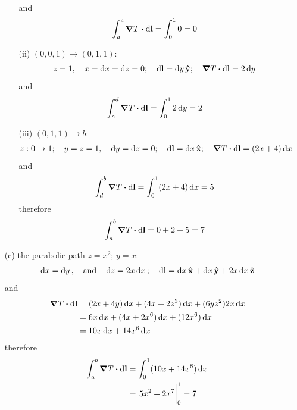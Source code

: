 \documentclass[../main.tex]{subfiles}
\begin{document}
\begin{itemize}
\begin{enumerate}
\begin{align*}
        \end{align*}
        and
        \begin{align*}
            \int_a^c \grad{T} \vdot \dd{\vb{l}} = \int_0^1 0 = 0
        \end{align*}
        \item [(ii)] $(0,0,1) \to (0,1,1)$:
        \begin{align*}
            z = 1, \quad x = \dd{x} = \dd{z} = 0; \quad \dd{\vb{l}} = \dd{y} \vu{y};
                \quad \grad{T} \vdot \dd{\vb{l}} = 2 \dd{y}
        \end{align*}
        and
        \begin{align*}
            \int_c^d \grad{T} \vdot \dd{\vb{l}} = \int_0^1 2 \dd{y} = 2
        \end{align*}
        \item [(iii)] $(0,1,1) \to b$:
        \begin{align*}
            z: 0 \to 1 ;\quad y = z = 1, \quad \dd{y} = \dd{z} = 0; \quad \dd{\vb{l}} = \dd{x} \vu{x};
                \quad \grad{T} \vdot \dd{\vb{l}} = (2x+4) \dd{x}
        \end{align*}
        and
        \begin{align*}
            \int_d^b \grad{T} \vdot \dd{\vb{l}} = \int_0^1 (2x+4) \dd{x} = 5
        \end{align*}
        therefore
        \begin{align*}
            \int_a^b \grad{T} \vdot \dd{\vb{l}} = 0 + 2 + 5 = 7
        \end{align*}
    \end{enumerate}
    \item[(c)] the parabolic path $z = x^2$; $y = x$:
    \begin{align*}
        \dd{x} = \dd{y}, \qand \dd{z} = 2x \dd{x}; \quad
        \dd{\vb{l}} = \dd{x} \vu{x} + \dd{x} \vu{y} + 2x\dd{x} \vu{z}
    \end{align*}
    and
    \begin{align*}
        \grad{T} \vdot \dd{\vb{l}} &= (2x+4y) \dd{x} + (4x+2z^3) \dd{x} + (6yz^2) 2x\dd{x} \\
        &= 6x \dd{x} + (4x + 2x^6) \dd{x} + (12x^6) \dd{x} \\
        &= 10x \dd{x} + 14x^6 \dd{x}
    \end{align*}
    therefore
    \begin{align*}
        \int_a^b \grad{T} \vdot \dd{\vb{l}} &= \int_0^1 (10x + 14x^6) \dd{x} \\
        &= \eval{5x^2 + 2x^7}_0^1 = 7
    \end{align*}
\end{itemize}
\end{document}
